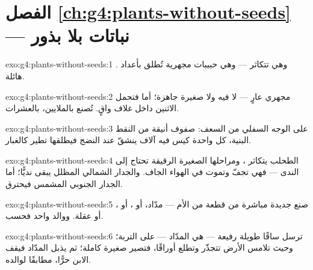 \section*{الفصل \ref{ch:g4:plants-without-seeds} --- نباتات بلا بذور}

\begin{solution}{exo:g4:plants-without-seeds:1}
 . وهي تتكاثر  --- وهي حبيبات مجهرية
تُطلق بأعداد هائلة.
\end{solution}

\begin{solution}{exo:g4:plants-without-seeds:2}
 مجهري عارٍ --- لا  فيه ولا  صغيرة جاهزة؛ أما
 فتحمل الاثنين داخل غلاف واقٍ.  تُصنع بالملايين،
 بالعشرات.
\end{solution}

\begin{solution}{exo:g4:plants-without-seeds:3}
على الوجه السفلي من السعف: صفوف أنيقة من النقط البنية، كل واحدة
كيس فيه آلاف  ينشقّ عند النضج فيطلقها تطير كالغبار.
\end{solution}

\begin{solution}{exo:g4:plants-without-seeds:4}
الطحلب يتكاثر ،  ومراحلها الصغيرة الرقيقة تحتاج
إلى الندى --- فهي تجفّ وتموت في الهواء الجاف. والجدار الشمالي
المظلل يبقى نديًّا؛ أما الجدار الجنوبي المشمس فيحترق.
\end{solution}

\begin{solution}{exo:g4:plants-without-seeds:5}
صنع  جديدة مباشرة من قطعة من  الأم --- مدّاد، أو ،
أو ، أو عقلة. ووالد واحد فحسب.
\end{solution}

\begin{solution}{exo:g4:plants-without-seeds:6}
ترسل  ساقًا طويلة رفيعة --- هي المدّاد --- على التربة؛ وحيث
تلامس الأرض تتجذّر وتطلع أوراقًا، فتصير  صغيرة كاملة؛ ثم يذبل
المدّاد فيقف الابن حرًّا، مطابقًا لوالده.
\end{solution}

